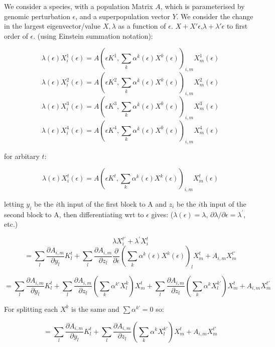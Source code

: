 \documentclass{article}
\begin{document}

We consider a species, with a population Matrix $A$, which is parameterised by genomic perturbation $\epsilon$, and a superpopulation vector $Y$. We consider the change in the largest eigenvector/value $X,\lambda$ as a function of $\epsilon$.
$X+X'\epsilon$,$\lambda+\lambda'\epsilon$ to first order of $\epsilon$. (using Einstein summation notation):

$$ \lambda(\epsilon)X_{i}^1(\epsilon) = A(\epsilon K^1,\sum_k\alpha^k(\epsilon)X^k(\epsilon))_{i,m}X_{m}^1(\epsilon) $$
$$ \lambda(\epsilon)X_{i}^2(\epsilon) = A(\epsilon K^2,\sum_k\alpha^k(\epsilon)X^k(\epsilon))_{i,m}X_{m}^2(\epsilon) $$
$$ \lambda(\epsilon)X_{i}^3(\epsilon) = A(\epsilon K^3,\sum_k\alpha^k(\epsilon)X^k(\epsilon))_{i,m}X_{m}^3(\epsilon) $$
$$ \lambda(\epsilon)X_{i}^4(\epsilon) = A(\epsilon K^4,\sum_k\alpha^k(\epsilon)X^k(\epsilon))_{i,m}X_{m}^4(\epsilon) $$

for arbitary $t$:

$$ \lambda(\epsilon)X_{i}^t(\epsilon) = A(\epsilon K^t,\sum_k\alpha^k(\epsilon)X^k(\epsilon))_{i,m}X_{m}^t(\epsilon) $$

letting $y_i$ be the $i$th input of the first block to A and $z_i$ be the $i$th input of the second block to A, then differentiating wrt to $\epsilon$ gives: ($\lambda(\epsilon) = \lambda$, $\partial\lambda/\partial\epsilon = \lambda^\prime$, etc.)

$$ \lambda X_i^{t\prime} + \lambda^\prime X_i^t $$
$$ = \sum_l \frac{\partial A_{i,m}}{\partial y_l}K^t_l + \sum_l\frac{\partial A_{i,m}}{\partial z_l}\frac{\partial}{\partial \epsilon} \left( \sum_k\alpha^k(\epsilon)X^k(\epsilon) \right)_lX_m^t + A_{i,m}X_m^{t\prime}$$

$$ = \sum_l \frac{\partial A_{i,m}}{\partial y_l}K^t_l
 + \sum_l\frac{\partial A_{i,m}}{\partial z_l}\left( \sum_k\alpha^{k\prime}X^k_l \right)X_m^t
 + \sum_l\frac{\partial A_{i,m}}{\partial z_l}\left( \sum_k\alpha^kX^{k\prime}_l \right)X_m^t
 + A_{i,m}X_m^{t\prime}$$

For splitting each $X^k$ is the same and $\sum\alpha^{k\prime}=0$ so:

$$ = \sum_l \frac{\partial A_{i,m}}{\partial y_l}K^t_l
 + \sum_l\frac{\partial A_{i,m}}{\partial z_l}\left( \sum_k\alpha^kX^{k\prime}_l \right)X_m^t
 + A_{i,m}X_m^{t\prime}$$
\end{document}
